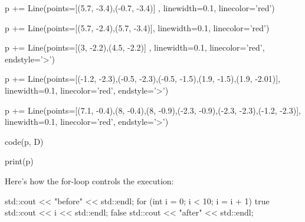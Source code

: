 \begin{python}
p += Line(points=[(5.7, -3.4),(-0.7, -3.4)] , linewidth=0.1, linecolor='red')

p += Line(points=[(5.7, -2.4),(5.7, -3.4)], linewidth=0.1, linecolor='red')

p += Line(points=[(3, -2.2),(4.5, -2.2)] , linewidth=0.1, linecolor='red', endstyle='>')

p += Line(points=[(-1.2, -2.3),(-0.5, -2.3),(-0.5, -1.5),(1.9, -1.5),(1.9, -2.01)], linewidth=0.1, linecolor='red', endstyle='>')

p += Line(points=[(7.1, -0.4),(8, -0.4),(8, -0.9),(-2.3, -0.9),(-2.3, -2.3),(-1.2, -2.3)], linewidth=0.1, linecolor='red', endstyle='>')

code(p, D)

print(p)
\end{python}
Here's how the for-loop controls the execution:
\begin{console}
std::cout << "before" << std::endl;
for (int i = 0; i < 10; i = i + 1)
true
std::cout << i << std::endl;
false
std::cout << "after" << std::endl;
\end{console}


